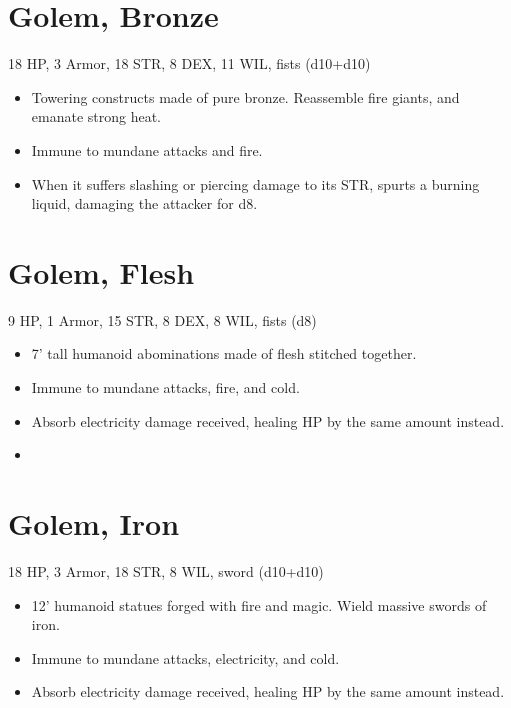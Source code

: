 \documentclass[
  10pt,
  american,
]{article}
\begin{document}
\hypertarget{golem-bronze}{%
\section{Golem, Bronze}\label{golem-bronze}}

18 HP, 3 Armor, 18 STR, 8 DEX, 11 WIL, fists (d10+d10)

\begin{samepage}
\begin{itemize}
\setlength\itemsep{-.5em}
\item Towering constructs made of pure bronze.   Reassemble fire giants, and emanate strong heat.
\item Immune to mundane attacks and fire.
\item When it suffers slashing or piercing damage to its STR, spurts a burning liquid, damaging the attacker for d8.
\end{itemize}
\end{samepage}

\hypertarget{golem-flesh}{%
\section{Golem, Flesh}\label{golem-flesh}}

9 HP, 1 Armor, 15 STR, 8 DEX, 8 WIL, fists (d8)

\begin{samepage}
\begin{itemize}
\setlength\itemsep{-.5em}
\item 7’ tall humanoid abominations made of flesh stitched together.
\item Immune to mundane attacks, fire, and cold.
\item Absorb electricity damage received, healing HP by the same amount instead.
\item 
\end{itemize}
\end{samepage}

\hypertarget{golem-iron}{%
\section{Golem, Iron}\label{golem-iron}}

18 HP, 3 Armor, 18 STR, 8 WIL, sword (d10+d10)

\begin{samepage}
\begin{itemize}
\setlength\itemsep{-.5em}
\item 12’ humanoid statues forged with fire and magic.   Wield massive swords of iron.
\item Immune to mundane attacks, electricity, and cold.
\item Absorb electricity damage received, healing HP by the same amount instead.
\end{itemize}
\end{samepage}
\end{document}
